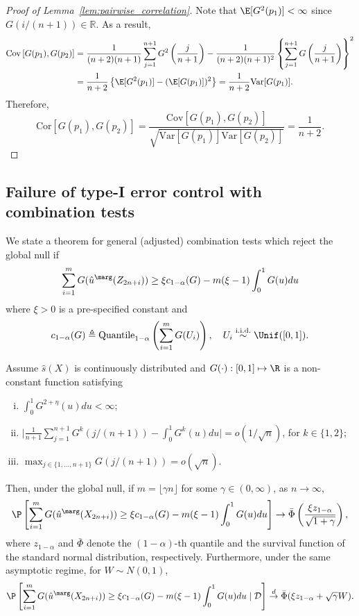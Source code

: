 \begin{proof}[Proof of Lemma~\ref{lem:pairwise_correlation}]
Note that $\E[G^2(p_1)] < \infty$ since $G(i / (n + 1))\in \mathbb{R}$. As a result,
\begin{align*}
  \mathrm{Cov}\left[ G(p_1), G(p_2) \right]
  &= \frac{1}{(n+2)(n+1)}\sum_{j=1}^{n+1}G^2\left(\frac{j}{n+1}\right) - \frac{1}{(n+2)(n+1)^2}\left\{\sum_{j=1}^{n+1}G\left(\frac{j}{n+1}\right)\right\}^2\\
  & = \frac{1}{n+2}\left\{\E[G^2(p_1)] - (\E[G(p_1)])^2\right\} = \frac{1}{n+2}\mathrm{Var}[G(p_1)].
\end{align*}
Therefore,
\[\mathrm{Cor}\left[ G(p_1), G(p_2) \right] = \frac{\mathrm{Cov}\left[ G(p_1), G(p_2) \right]}{\sqrt{\mathrm{Var}[G(p_1)]\mathrm{Var}[G(p_2)]}} = \frac{1}{n + 2}.\]
\end{proof}

\subsection{Failure of type-I error control with combination tests} \label{app:global_testing}
We state a theorem for general (adjusted) combination tests which reject the global null if $$
\sum_{i=1}^{m}G(\hat{u}^\marg(Z_{2n+i}))\ge \xi c_{1-\alpha}(G) - m(\xi - 1)\int_0^1 G(u)du
$$
where $\xi > 0$ is a pre-specified constant and
$$c_{1-\alpha}(G)\triangleq \textnormal{Quantile}_{1 - \alpha}\left(\sum_{i=1}^{m}G(U_i)\right), \quad U_i\stackrel{\mathrm{i.i.d.}}{\sim}\Unif([0, 1]).
$$

\begin{thm}\label{thm:combination_test}
Assume $\hat{s}(X)$ is continuously distributed and $G(\cdot): [0, 1]\mapsto \R$ is a non-constant function satisfying
\begin{enumerate}[(i)]
    \item $\int_{0}^{1}G^{2 + \eta}(u)du < \infty$;
    \item $\big|\frac{1}{n+1}\sum_{j=1}^{n+1}G^k\left(j / (n + 1)\right) - \int_{0}^{1}G^{k}(u)du\big| = o(1 / \sqrt{n})$, for $k \in \{1, 2\}$;
    \item $\max_{j\in \{1, \ldots, n + 1\}}G(j / (n + 1)) = o(\sqrt{n})$.
\end{enumerate}
Then, under the global null, if $m = \lfloor\gamma n\rfloor$ for some $\gamma \in (0, \infty)$, as $n \to \infty$,
\begin{equation}\label{eq:unconditional_typeI}
\P\left[\sum_{i=1}^{m} G(\hat{u}^\marg(X_{2n+i}))\ge \xi c_{1 - \alpha}(G) - m(\xi - 1)\int_0^1 G(u)du\right]\rightarrow \bar{\Phi}\left(\frac{\xi z_{1 - \alpha}}{\sqrt{1 + \gamma}}\right),
\end{equation}
where $z_{1 - \alpha}$ and $\bar{\Phi}$ denote the $(1 - \alpha)$-th quantile and the survival function of the standard normal distribution, respectively. Furthermore, under the same asymptotic regime, for $W\sim N(0, 1)$,
\begin{equation}\label{eq:conditional_typeI-app}
\P\left[\sum_{i=1}^{m}G(\hat{u}^\marg(X_{2n+i}))\ge \xi c_{1 - \alpha}(G) - m(\xi - 1)\int_0^1 G(u)du\mid \mathcal{D} \right]\stackrel{d}{\rightarrow} \bar{\Phi}(\xi z_{1 - \alpha} + \sqrt{\gamma} W).
\end{equation}
\end{thm}

